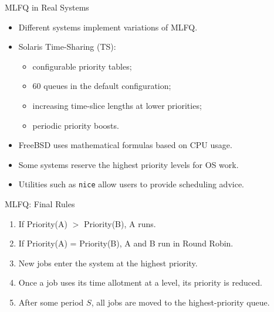 
\begin{frame}{MLFQ in Real Systems}
    \begin{itemize}
        \item Different systems implement variations of MLFQ.
        \item Solaris Time-Sharing (TS):
        \begin{itemize}
            \item configurable priority tables;
            \item 60 queues in the default configuration;
            \item increasing time-slice lengths at lower priorities;
            \item periodic priority boosts.
        \end{itemize}

        \item FreeBSD uses mathematical formulas based on CPU usage.
        \item Some systems reserve the highest priority levels for OS work.
        \item Utilities such as \texttt{nice} allow users to provide scheduling advice.
    \end{itemize}
\end{frame}


\begin{frame}{MLFQ: Final Rules}
    \small
    \begin{enumerate}
        \item If Priority(A) $>$ Priority(B), A runs.
        \item If Priority(A) = Priority(B), A and B run in Round Robin.
        \item New jobs enter the system at the highest priority.
        \item Once a job uses its time allotment at a level, its priority is reduced.
        \item After some period $S$, all jobs are moved to the highest-priority queue.
    \end{enumerate}
\end{frame}


